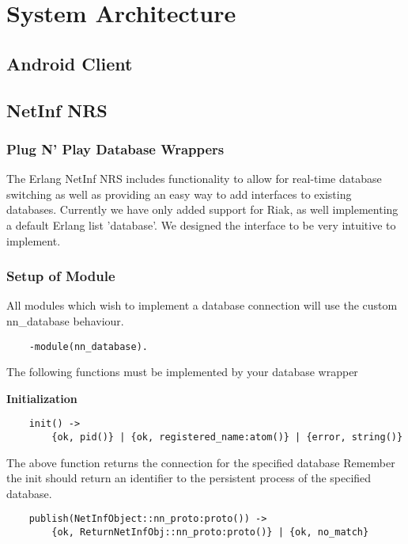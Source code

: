 \documentclass[11pt]{report}
\begin{document}
\chapter{System Architecture}

\section {Android Client}

\section {NetInf NRS}

\subsection {Plug N' Play Database Wrappers}

The Erlang NetInf NRS includes functionality to allow for real-time database switching as well as providing an easy way to add interfaces to existing databases. Currently we have only added support for Riak, as well implementing a default Erlang list 'database'.  We designed the interface to be very intuitive to implement.

\subsection {Setup of Module}

All modules which wish to implement a database connection will use the custom nn\_database behaviour.

\begin {verbatim}
    -module(nn_database).
\end{verbatim}

The following functions must be implemented by your database wrapper

\textbf{Initialization}

\begin {verbatim}
    init() -> 
    	{ok, pid()} | {ok, registered_name:atom()} | {error, string()}
\end{verbatim}

The above function returns the connection for the specified database
Remember the init should return an identifier to the persistent process of the specified database.

\begin {verbatim}
    publish(NetInfObject::nn_proto:proto()) -> 
    	{ok, ReturnNetInfObj::nn_proto:proto()} | {ok, no_match}
\end{verbatim}
\end{document}
